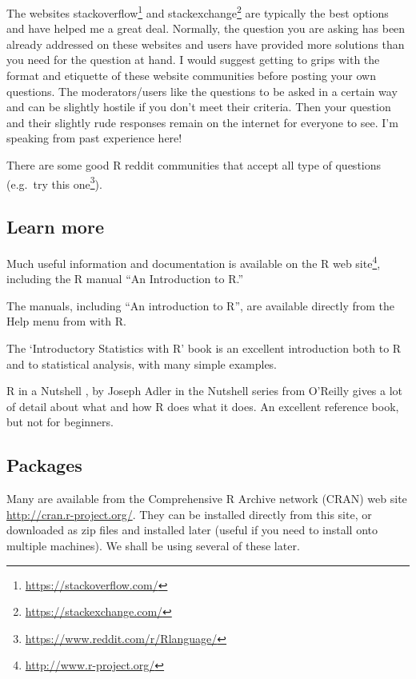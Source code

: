 \documentclass[
]{book}
\makeatletter
\renewcommand{\href}[2]{#2\footnote{\url{#1}}}
\newenvironment{kframe}{%
\medskip{}
\setlength{\fboxsep}{.8em}
 \def\at@end@of@kframe{}%
 \ifinner\ifhmode%
  \def\at@end@of@kframe{\end{minipage}}%
  \begin{minipage}{\columnwidth}%
 \fi\fi%
 \def\FrameCommand##1{\hskip\@totalleftmargin \hskip-\fboxsep
 \colorbox{shadecolor}{##1}\hskip-\fboxsep
     \hskip-\linewidth \hskip-\@totalleftmargin \hskip\columnwidth}%
 \MakeFramed {\advance\hsize-\width
   \@totalleftmargin\z@ \linewidth\hsize
   \@setminipage}}%
 {\par\unskip\endMakeFramed%
 \at@end@of@kframe}
\newenvironment{rmdblock}[1]
  {
  \begin{itemize}
  \renewcommand{\labelitemi}{
    \raisebox{-.7\height}[0pt][0pt]{
      {\setkeys{Gin}{width=3em,keepaspectratio}\texttt{[image: images/\#1]}}
    }
  }
  \setlength{\fboxsep}{1em}
  \begin{kframe}
  \item
  }
  {
  \end{kframe}
  \end{itemize}
  }
\newenvironment{rmdnote}
  {\begin{rmdblock}{note}}
  {\end{rmdblock}}
\makeatother
\begin{document}
The websites \href{https://stackoverflow.com/}{stackoverflow} and \href{https://stackexchange.com/}{stackexchange} are typically the best options and have helped me a great deal. Normally, the question you are asking has been already addressed on these websites and users have provided more solutions than you need for the question at hand. I would suggest getting to grips with the format and etiquette of these website communities before posting your own questions. The moderators/users like the questions to be asked in a certain way and can be slightly hostile if you don't meet their criteria. Then your question and their slightly rude responses remain on the internet for everyone to see. I'm speaking from past experience here!

There are some good R reddit communities that accept all type of questions (e.g.~\href{https://www.reddit.com/r/Rlanguage/}{try this one}).

\hypertarget{learn-more}{%
\subsection{Learn more}\label{learn-more}}

Much useful information and documentation is available on the \href{http://www.r-project.org/}{R web site}, including the R manual ``An Introduction to R.''

\begin{rmdnote}
The manuals, including ``An introduction to R'', are available directly from the Help menu from with R.
\end{rmdnote}

The `Introductory Statistics with R' book \citep{dalgaard_introductory_2008} is an excellent introduction both to R and to statistical analysis, with many simple examples.

R in a Nutshell \citep{adler_r_2010}, by Joseph Adler in the Nutshell series from O'Reilly gives a lot of detail about what and how R does what it does. An excellent reference book, but not for beginners.

\hypertarget{packages}{%
\subsection{Packages}\label{packages}}

Many are available from the Comprehensive R Archive network (CRAN) web site \url{http://cran.r-project.org/}. They can be installed directly from this site, or downloaded as zip files and installed later (useful if you need to install onto multiple machines). We shall be using several of these later.
\end{document}

